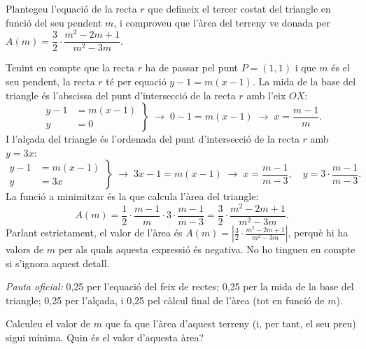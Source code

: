 \begin{apartats}

Plantegeu l'equació de la recta $r$ que defineix el tercer costat del triangle en funció del seu pendent $m$,
i comproveu que l'àrea del terreny ve donada per $A(m)=\dfrac32\cdot\dfrac{m^2-2m+1}{m^2-3m}$.

\begin{solucio}
Tenint en compte que la recta $r$ ha de passar pel punt $P=(1,1)$ i que $m$ és el seu pendent, la recta $r$ té
per equació $y-1=m(x-1)$. La mida de la base del triangle és l'abscissa del punt d'intersecció de la recta $r$
amb l'eix $OX$:
\[
\left.\begin{aligned}y-1&=m(x-1)\\y&=0\end{aligned}\right\}\;\rightarrow\;0-1=m(x-1)\;\rightarrow\;x=\frac{m-1}{m}.
\]
I l'alçada del triangle és l'ordenada del punt d'intersecció de la recta $r$ amb $y=3x$:
\[
\left.\begin{aligned}y-1&=m(x-1)\\y&=3x\end{aligned}\right\}\;\rightarrow\;3x-1=m(x-1)\;\rightarrow\;
x=\frac{m-1}{m-3},\quad y=3\cdot\frac{m-1}{m-3}.
\]
La funció a minimitzar és la que calcula l'àrea del triangle:
\[
A(m)=\frac12\cdot\frac{m-1}{m}\cdot3\cdot\frac{m-1}{m-3}=\frac32\cdot\frac{m^2-2m+1}{m^2-3m}.
\]
Parlant estrictament, el valor de l'àrea és $A(m)=\left|\frac32\cdot\frac{m^2-2m+1}{m^2-3m}\right|$, perquè hi
ha valors de $m$ per als quals aquesta expressió és negativa. No ho tingueu en compte si s'ignora aquest
detall.

\textit{Pauta oficial:} 0,25 per l'equació del feix de rectes; 0,25 per la mida de la base del triangle; 0,25
per l'alçada, i 0,25 pel càlcul final de l'àrea (tot en funció de $m$).
\end{solucio}

Calculeu el valor de $m$ que fa que l'àrea d'aquest terreny (i, per tant, el seu preu) sigui mínima. Quin és el
valor d'aquesta àrea?


\end{apartats}
